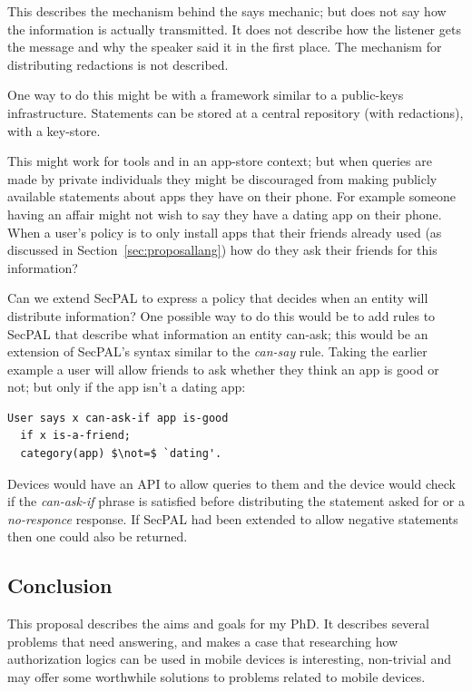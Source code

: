 \documentclass[a4paper]{article}
\begin{document}
This describes the mechanism behind the says mechanic; but does not say how the
information is actually transmitted.  It does not describe how the listener gets
the message and why the speaker said it in the first place.
The mechanism for distributing redactions is not described. 

One way to do this
might be with a framework similar to a public-keys infrastructure.
Statements can be stored at a central repository (with redactions), with a
key-store.  

This might work for tools and in an app-store context; but when queries are made
by private individuals they might be discouraged from making publicly available
statements about apps they have on their phone.  For example someone having an
affair might not wish to say they have a dating app on their phone.  When a
user's policy is to only install apps that their friends already used (as
discussed in Section~\ref{sec:proposallang}) how do they ask their friends for
this information?  

Can we extend SecPAL to express a policy that decides when an
entity will distribute information?
One possible way to do this would be to add rules to SecPAL that describe what
information an entity can-ask; this would be an extension of SecPAL's syntax
similar to the \emph{can-say} rule.  Taking the earlier example a user will allow
friends to ask whether they think an app is good or not; but only if the app
isn't a dating app:

\begin{lstlisting}[language=SecPAL,mathescape=true]
User says x can-ask-if app is-good
  if x is-a-friend;
  category(app) $\not=$ `dating'.
\end{lstlisting}

Devices would have an API to allow queries to them and the device would check if
the \emph{can-ask-if} phrase is satisfied before distributing the statement
asked for or a \emph{no-responce} response.  If SecPAL had been extended
to allow negative statements then one could also be returned.

\subsection{Conclusion}

This proposal describes the aims and goals for my PhD.  It describes several
problems that need answering, and makes a case that researching how
authorization logics can be used in mobile devices is interesting, non-trivial
and may offer some worthwhile solutions to problems related to mobile devices.
\end{document}
